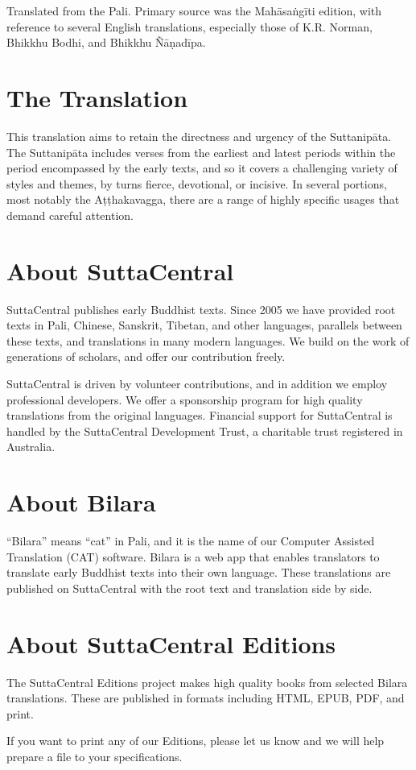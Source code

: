 \documentclass[12pt,openany]{book}%
\begin{document}
Translated from the Pali. Primary source was the \textsanskrit{Mahāsaṅgīti} edition, with reference to several English translations, especially those of K.R. Norman, Bhikkhu Bodhi, and Bhikkhu \textsanskrit{Ñāṇadīpa}.

\section*{The Translation}

This translation aims to retain the directness and urgency of the \textsanskrit{Suttanipāta}. The \textsanskrit{Suttanipāta} includes verses from the earliest and latest periods within the period encompassed by the early texts, and so it covers a challenging variety of styles and themes, by turns fierce, devotional, or incisive. In several portions, most notably the \textsanskrit{Aṭṭhakavagga}, there are a range of highly specific usages that demand careful attention.

\section*{About SuttaCentral}

SuttaCentral publishes early Buddhist texts. Since 2005 we have provided root texts in Pali, Chinese, Sanskrit, Tibetan, and other languages, parallels between these texts, and translations in many modern languages. We build on the work of generations of scholars, and offer our contribution freely.

SuttaCentral is driven by volunteer contributions, and in addition we employ professional developers. We offer a sponsorship program for high quality translations from the original languages. Financial support for SuttaCentral is handled by the SuttaCentral Development Trust, a charitable trust registered in Australia.

\section*{About Bilara}

“Bilara” means “cat” in Pali, and it is the name of our Computer Assisted Translation (CAT) software. Bilara is a web app that enables translators to translate early Buddhist texts into their own language. These translations are published on SuttaCentral with the root text and translation side by side.

\section*{About SuttaCentral Editions}

The SuttaCentral Editions project makes high quality books from selected Bilara translations. These are published in formats including HTML, EPUB, PDF, and print.

If you want to print any of our Editions, please let us know and we will help prepare a file to your specifications.

%
\end{document}
